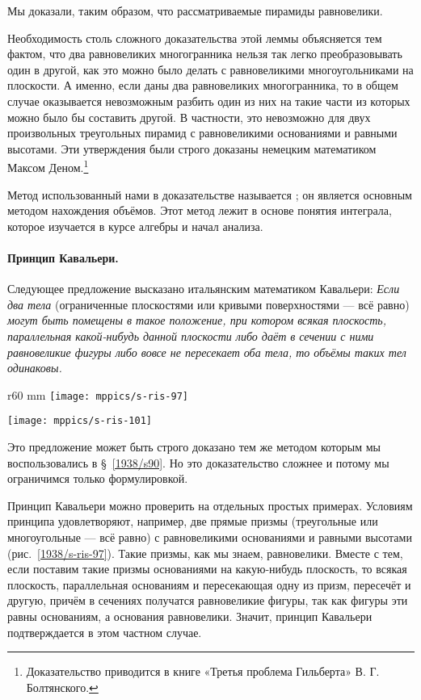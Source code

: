 Мы доказали, таким образом, что рассматриваемые пирамиды равновелики.

\medskip

Необходимость столь сложного доказательства этой леммы объясняется тем фактом, что два равновеликих многогранника нельзя так легко преобразовывать один в другой, как это можно было делать с равновеликими многоугольниками на плоскости.
А именно, если даны два равновеликих многогранника, то в общем случае оказывается невозможным разбить один из них на такие части из которых можно было бы составить другой.
В частности, это невозможно для двух произвольных треугольных пирамид с равновеликими основаниями и равными высотами.
Эти утверждения были строго доказаны немецким математиком Максом Деном.\footnote{Доказательство приводится в книге «Третья проблема Гильберта» В. Г. Болтянского.}

Метод использованный нами в доказательстве называется ; он является основным методом нахождения объёмов.
Этот метод лежит в основе понятия интеграла, которое изучается в курсе алгебры и начал анализа.

\paragraph{Принцип Кавальери.}\label{1938/s89} 
Следующее предложение высказано итальянским математиком Кавальери:
\emph{Если два тела} (ограниченные плоскостями или кривыми поверхностями — всё равно) \emph{могут быть помещены в такое положение, при котором всякая плоскость, параллельная какой-нибудь данной плоскости либо даёт в сечении с ними равновеликие фигуры либо вовсе не пересекает оба тела, то объёмы таких тел одинаковы.}

\begin{wrapfigure}{r}{60 mm}
\vskip-0mm
\centering
\texttt{[image: mppics/s-ris-97]}
\caption{}\label{1938/s-ris-97}
\bigskip
\texttt{[image: mppics/s-ris-101]}
\caption{}\label{1938/s-ris-101}%
\vskip-0mm
\end{wrapfigure}

Это предложение может быть строго доказано тем же методом которым мы воспользовались в §~\ref{1938/s90}.
Но это доказательство сложнее и потому мы ограничимся только формулировкой.

Принцип Кавальери можно проверить на отдельных простых примерах.
Условиям принципа удовлетворяют, например, две прямые призмы (треугольные или многоугольные — всё равно) с равновеликими основаниями и равными высотами (рис.~\ref{1938/s-ris-97}).
Такие призмы, как мы знаем, равновелики.
Вместе с тем, если поставим такие призмы основаниями на какую-нибудь плоскость, то всякая плоскость, параллельная основаниям и пересекающая одну из призм, пересечёт и другую, причём в сечениях получатся равновеликие фигуры, так как фигуры эти равны основаниям, а основания равновелики.
Значит, принцип Кавальери подтверждается в этом частном случае.

